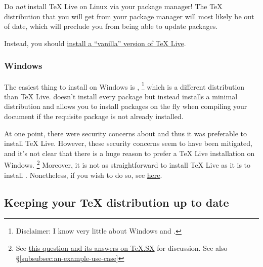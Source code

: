 Do \emph{not} install TeX Live on Linux via your package manager!
The \TeX{} distribution that you will get from your package manager will most likely be out of date, which will preclude you from being able to update packages.

Instead, you should \href{http://tex.stackexchange.com/q/1092/32888}{install a ``vanilla'' version of TeX Live}.

\subsubsection{Windows}
\label{subsubsec:tex-distro:windows}

The easiest thing to install on Windows is ,%
\footnote{%
Disclaimer: I know very little about Windows and .%
} %
which is a different distribution than TeX Live.
 doesn't install every package but instead installs a minimal distribution and allows you to install packages on the fly when compiling your document if the requisite package is not already installed.

At one point, there were security concerns about  and thus it was preferable to install TeX Live.
However, these security concerns seem to have been mitigated, and it's not clear that there is a huge reason to prefer a TeX Live installation on Windows.%
\footnote{%
See \href{http://tex.stackexchange.com/q/20036/32888}{this question and its answers on TeX.SX} for discussion.
See also \S\ref{subsubsec:an-example-use-case}%
}
Moreover, it is not as straightforward to install TeX Live as it is to install .
Nonetheless, if you wish to do so, see \href{http://www.tug.org/texlive/acquire-netinstall.html}{here}.

\subsection{Keeping your \TeX{} distribution up to date}
\label{subsec:keeping-your-tex-distro-up-to-date}

